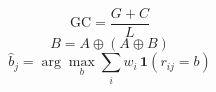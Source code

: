 \[\mathrm{GC}=\frac{G+C}{L}\]
\[B=A\oplus(A\oplus B)\]
\[\hat b_j=\arg\max_b\sum_i w_i\,\mathbf{1}(r_{ij}=b)\]
